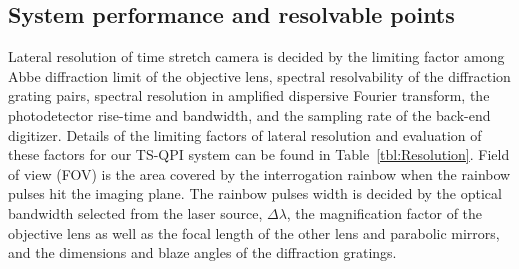 \documentclass[aps,pra,reprint,groupedaddress]{revtex4-1}
\begin{document}
\subsection{System performance and resolvable points}
Lateral resolution of time stretch camera is decided by the limiting factor among Abbe diffraction limit of the objective lens, spectral resolvability of the diffraction grating pairs, spectral resolution in amplified dispersive Fourier transform, the photodetector rise-time and bandwidth, and the sampling rate of the back-end digitizer. Details of the limiting factors of lateral resolution and evaluation of these factors for our TS-QPI system can be found in Table~\ref{tbl:Resolution}. Field of view (FOV) is the area covered by the interrogation rainbow when the rainbow pulses hit the imaging plane. The rainbow pulses width is decided by the optical bandwidth selected from the laser source, $\Delta\lambda$, the magnification factor of the objective lens as well as the focal length of the other lens and parabolic mirrors, and the dimensions and blaze angles of the diffraction gratings.
\end{document}
